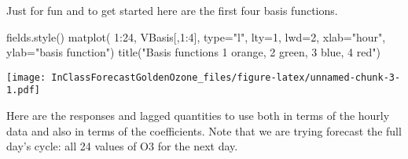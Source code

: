 \documentclass[
]{article}
\newenvironment{Shaded}{\begin{snugshade}}{\end{snugshade}}
\newcommand{\AttributeTok}[1]{\textcolor[rgb]{0.77,0.63,0.00}{#1}}
\newcommand{\CommentTok}[1]{\textcolor[rgb]{0.56,0.35,0.01}{\textit{#1}}}
\newcommand{\DecValTok}[1]{\textcolor[rgb]{0.00,0.00,0.81}{#1}}
\newcommand{\FunctionTok}[1]{\textcolor[rgb]{0.00,0.00,0.00}{#1}}
\newcommand{\NormalTok}[1]{#1}
\newcommand{\OtherTok}[1]{\textcolor[rgb]{0.56,0.35,0.01}{#1}}
\newcommand{\SpecialCharTok}[1]{\textcolor[rgb]{0.00,0.00,0.00}{#1}}
\newcommand{\StringTok}[1]{\textcolor[rgb]{0.31,0.60,0.02}{#1}}
\begin{document}
\begin{Shaded}
\end{Shaded}

Just for fun and to get started here are the first four basis functions.

\begin{Shaded}
\begin{Highlighting}[]
\FunctionTok{fields.style}\NormalTok{()}
\FunctionTok{matplot}\NormalTok{( }\DecValTok{1}\SpecialCharTok{:}\DecValTok{24}\NormalTok{, VBasis[,}\DecValTok{1}\SpecialCharTok{:}\DecValTok{4}\NormalTok{], }\AttributeTok{type=}\StringTok{"l"}\NormalTok{, }\AttributeTok{lty=}\DecValTok{1}\NormalTok{, }\AttributeTok{lwd=}\DecValTok{2}\NormalTok{,}
         \AttributeTok{xlab=}\StringTok{"hour"}\NormalTok{, }\AttributeTok{ylab=}\StringTok{"basis function"}\NormalTok{)}
\FunctionTok{title}\NormalTok{(}\StringTok{"Basis functions}
\StringTok{      1 orange, 2 green, 3 blue, 4 red"}\NormalTok{)}
\end{Highlighting}
\end{Shaded}

\texttt{[image: InClassForecastGoldenOzone\_files/figure-latex/unnamed-chunk-3-1.pdf]}

Here are the responses and lagged quantities to use both in terms of the
hourly data and also in terms of the coefficients. Note that we are
trying forecast the full day's cycle: all 24 values of O3 for the next
day.
\end{document}
